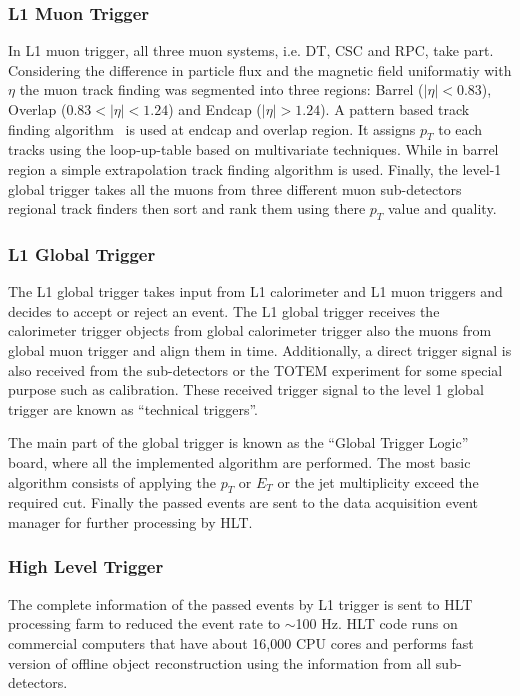 

\subsubsection{L1 Muon Trigger} %
\label{ssub:l1_muon_trigger}
In L1 muon trigger, all three muon systems, i.e. DT, CSC and RPC, take part. Considering the difference in particle flux and the magnetic field uniformatiy with $\eta$ the muon track finding was segmented into three regions: Barrel ($|\eta|<0.83$), Overlap ($0.83<|\eta| < 1.24$) and Endcap ($|\eta|>1.24$). A pattern based track finding algorithm~\cite{Eroe2008} is used at endcap and overlap region. It assigns $p_T$ to each tracks using the loop-up-table based on multivariate techniques. While in barrel region a simple extrapolation track finding algorithm is used. Finally, the level-1 global trigger takes all the muons from three different muon sub-detectors regional track finders then sort and rank them using there $p_T$ value and quality.


\subsubsection{L1 Global Trigger} %
\label{ssub:l1_global_trigger}
The L1 global trigger takes input from L1 calorimeter and L1 muon triggers and decides to accept or reject an event. The L1 global trigger receives the calorimeter trigger objects from global calorimeter trigger also the muons from global muon trigger and align them in time. Additionally, a direct trigger signal is also received from the sub-detectors or the TOTEM experiment for some special purpose such as calibration. These received trigger signal to the level 1 global trigger are known as ``technical triggers''. 

The main part of the global trigger is known as the ``Global Trigger Logic'' board, where all the implemented algorithm are performed. The most basic algorithm consists of applying the $p_T$ or $E_T$ or the jet multiplicity exceed the required cut. Finally the passed events are sent to the data acquisition event manager for further processing by HLT.





\subsubsection{High Level Trigger} %
\label{ssub:high_level_trigger}
The complete information of the passed events by L1 trigger is sent to HLT processing farm to reduced the event rate to $\sim$100 Hz. HLT code runs on commercial computers that have about 16,000 CPU cores and performs fast version of offline object reconstruction using the information from all sub-detectors. 

